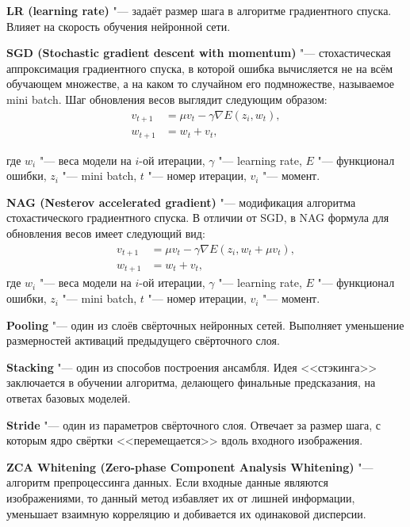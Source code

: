 \textbf{LR (learning rate)} "--- задаёт размер шага в алгоритме градиентного спуска. Влияет на скорость обучения нейронной сети.

\textbf{SGD (Stochastic gradient descent with momentum)} "--- стохастическая аппроксимация градиентного спуска,
в которой ошибка вычисляется не на всём обучающем множестве, а на каком то случайном его подмножестве, называемое mini batch.
Шаг обновления весов выглядит следующим образом:
\begin{align*}
    v_{t+1} &= \mu v_{t} - \gamma \nabla E(z_i, w_t),\\
    w_{t+1} &= w_t + v_t,
\end{align*}

где $w_i$ "--- веса модели на $i$-ой итерации, $\gamma$ "--- learning rate, $E$ "--- функционал ошибки,
$z_i$ "--- mini batch, $t$ "--- номер итерации, $v_i$ "--- момент.

\textbf{NAG (Nesterov accelerated gradient)} "--- модификация алгоритма стохастического градиентного спуска. В отличии от SGD, в NAG
формула для обновления весов имеет следующий вид:
\begin{align*}
    v_{t+1} &= \mu v_{t} - \gamma \nabla E(z_i, w_t + \mu v_t),\\
    w_{t+1} &= w_t + v_t,
\end{align*}
где $w_i$ "--- веса модели на $i$-ой итерации, $\gamma$ "--- learning rate, $E$ "--- функционал ошибки,
$z_i$ "--- mini batch, $t$ "--- номер итерации, $v_i$ "--- момент.

\textbf{Pooling} "--- один из слоёв свёрточных нейронных сетей.
Выполняет уменьшение размерностей активаций предыдущего свёрточного слоя.

\textbf{Stacking} "--- один из способов построения ансамбля. Идея <<стэкинга>> заключается в обучении
алгоритма, делающего финальные предсказания, на ответах базовых моделей.

\textbf{Stride} "--- один из параметров свёрточного слоя. Отвечает за размер шага, с которым ядро свёртки <<перемещается>>
вдоль входного изображения.

\textbf{ZCA Whitening (Zero-phase Component Analysis Whitening)} "--- алгоритм препроцессинга данных. Если входные данные
являются изображениями, то данный метод избавляет их от лишней информации, уменьшает взаимную корреляцию и добивается
их одинаковой дисперсии.